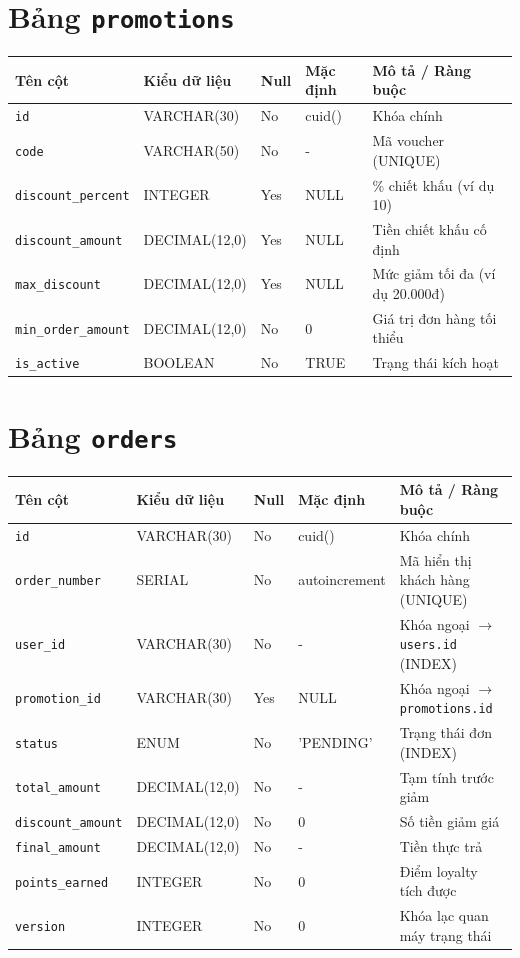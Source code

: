 \documentclass[12pt,a4paper,oneside]{report}
\begin{document}
\section{Bảng \texttt{promotions}}
\begin{table}[H]
\centering
\small
\begin{tabularx}{\textwidth}{llllX}
\toprule
\textbf{Tên cột} & \textbf{Kiểu dữ liệu} & \textbf{Null} & \textbf{Mặc định} & \textbf{Mô tả / Ràng buộc} \\
\midrule
\texttt{id} & VARCHAR(30) & No & cuid() & Khóa chính \\
\texttt{code} & VARCHAR(50) & No & - & Mã voucher (UNIQUE) \\
\texttt{discount\_percent} & INTEGER & Yes & NULL & \% chiết khấu (ví dụ 10) \\
\texttt{discount\_amount} & DECIMAL(12,0) & Yes & NULL & Tiền chiết khấu cố định \\
\texttt{max\_discount} & DECIMAL(12,0) & Yes & NULL & Mức giảm tối đa (ví dụ 20.000đ) \\
\texttt{min\_order\_amount} & DECIMAL(12,0) & No & 0 & Giá trị đơn hàng tối thiểu \\
\texttt{is\_active} & BOOLEAN & No & TRUE & Trạng thái kích hoạt \\
\bottomrule
\end{tabularx}
\end{table}

\section{Bảng \texttt{orders}}
\begin{table}[H]
\centering
\small
\begin{tabularx}{\textwidth}{llllX}
\toprule
\textbf{Tên cột} & \textbf{Kiểu dữ liệu} & \textbf{Null} & \textbf{Mặc định} & \textbf{Mô tả / Ràng buộc} \\
\midrule
\texttt{id} & VARCHAR(30) & No & cuid() & Khóa chính \\
\texttt{order\_number} & SERIAL & No & autoincrement & Mã hiển thị khách hàng (UNIQUE) \\
\texttt{user\_id} & VARCHAR(30) & No & - & Khóa ngoại \(\to\) \texttt{users.id} (INDEX) \\
\texttt{promotion\_id} & VARCHAR(30) & Yes & NULL & Khóa ngoại \(\to\) \texttt{promotions.id} \\
\texttt{status} & ENUM & No & 'PENDING' & Trạng thái đơn (INDEX) \\
\texttt{total\_amount} & DECIMAL(12,0) & No & - & Tạm tính trước giảm \\
\texttt{discount\_amount} & DECIMAL(12,0) & No & 0 & Số tiền giảm giá \\
\texttt{final\_amount} & DECIMAL(12,0) & No & - & Tiền thực trả \\
\texttt{points\_earned} & INTEGER & No & 0 & Điểm loyalty tích được \\
\texttt{version} & INTEGER & No & 0 & Khóa lạc quan máy trạng thái \\
\bottomrule
\end{tabularx}
\end{table}
\end{document}
